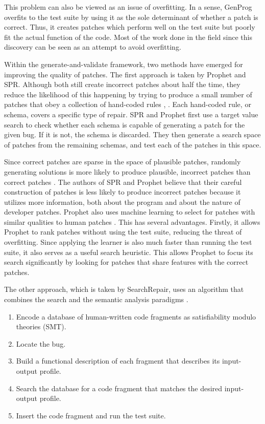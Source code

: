 \documentclass{paper}
\begin{document}
This problem can also be viewed as an issue of overfitting. 
In a sense, GenProg overfits to the test suite by using it as the sole determinant of whether a patch is correct. 
Thus, it creates patches which perform well on the test suite but poorly fit the actual function of the code. 
Most of the work done in the field since this discovery can be seen as an attempt to avoid overfitting.

Within the generate-and-validate framework, two methods have emerged for improving the quality of patches. 
The first approach is taken by Prophet and SPR. Although both still create incorrect patches about half the time, they reduce the likelihood of this happening by trying to produce a small number of patches that obey a collection of hand-coded rules \cite{SPR}, \cite{Prophet}. 
Each hand-coded rule, or schema, covers a specific type of repair. SPR and Prophet first use a target value search to check whether each schema is capable of generating a patch for the given bug. 
If it is not, the schema is discarded. 
They then generate a search space of patches from the remaining schemas, and test each of the patches in this space.

Since correct patches are sparse in the space of plausible patches, randomly generating solutions is more likely to produce plausible, incorrect patches than correct patches \cite{Analysis of search space}.  
The authors of SPR and Prophet believe that their careful construction of patches is less likely to produce incorrect patches because it utilizes more information, both about the program and about the nature of developer patches.  
Prophet also uses machine learning to select for patches with similar qualities to human patches \cite{Prophet}. 
This has several advantages. 
Firstly, it allows Prophet to rank patches without using the test suite, reducing the threat of overfitting. 
Since applying the learner is also much faster than running the test suite, it also serves as a useful search heuristic. 
This allows Prophet to focus its search significantly by looking for patches that share features with the correct patches. 

The other approach, which is taken by SearchRepair, uses an algorithm that combines the search and the semantic analysis paradigms \cite{SearchRepair}. 
\begin{enumerate}
\item Encode a database of human-written code fragments as satisfiability modulo theories (SMT).
\item Locate the bug.
\item Build a functional description of each fragment that describes its input-output profile.
\item Search the database for a code fragment that matches the desired input-output profile.
\item Insert the code fragment and run the test suite.
\end{enumerate}
\end{document}
